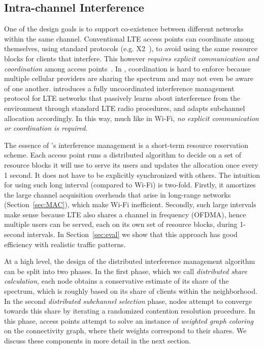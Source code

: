 \subsection{Intra-channel Interference}
\label{sec:archint}

One of the \cf design goals is to support co-existence between different networks within the same channel.
Conventional LTE access points can coordinate among themselves, using standard protocols (e.g. X2~\cite{LTEbook}), to avoid using the same resource blocks for clients that interfere. This however {\em requires explicit communication and coordination} among access points~\cite{smallcellbook, fermi}. In \cf, coordination is hard to enforce because
 multiple cellular providers are sharing the spectrum and may not even be aware of one another.  
\cf introduces a fully uncoordinated interference management protocol for LTE networks that passively learns about interference from the environment through standard LTE radio procedures, and adapts subchannel allocation accordingly. 
In this way, much like in Wi-Fi, {\em no explicit communication or coordination is required}. 


The essence of \cf's interference management is a short-term resource reservation scheme. 
Each access point runs a distributed algorithm to decide on a set of resource blocks it will use to serve its users and updates the allocation once every 1 second. 
It does not have to be explicitly synchronized with others. 
The intuition for using such long interval (compared to Wi-Fi) is two-fold. 
Firstly, it amortizes the large channel acquisition overheads that arise in long-range networks (Section~\ref{sec:MAC}), which make Wi-Fi inefficient. 
Secondly, such large intervals make sense because LTE also shares a channel in frequency (OFDMA), 
hence multiple users can be served, each on its own set of resource blocks, during 1-second intervals. 
In Section~\ref{sec:eval} we show that this approach has good efficiency with realistic traffic patterns. 

At a high level, the design of the \cf distributed interference management algorithm can be split into two phases.
In the first phase, which we call \emph{distributed share calculation}, 
each node obtains a conservative estimate of its share of the spectrum, 
which is roughly based on its share of clients within the neighborhood.
In the second \emph{distributed subchannel selection} phase, 
nodes attempt to converge towards this share by iterating a randomized contention resolution procedure. 
In this phase, access points attempt to solve an instance of \emph{weighted graph coloring} on the connectivity graph, 
where their weights correspond to their shares.
We discuss these components in more detail in the next section. 


